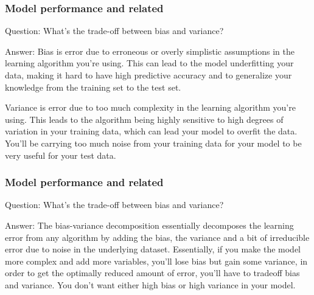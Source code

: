 \documentclass[11pt]{beamer}
\begin{document}
\begin{frame}
\frametitle{Model performance and related}
\begin{block}{Question:}
	What’s the trade-off between bias and variance?
\end{block}
\begin{block}{Answer:}
	Bias is error due to erroneous or overly simplistic assumptions in the learning algorithm you’re using. This can lead to the model underfitting your data, making it hard to have high predictive accuracy and to generalize your knowledge from the training set to the test set.
	
	Variance is error due to too much complexity in the learning algorithm you’re using. This leads to the algorithm being highly sensitive to high degrees of variation in your training data, which can lead your model to overfit the data. You’ll be carrying too much noise from your training data for your model to be very useful for your test data.
\end{block}
\end{frame}

\begin{frame}
\frametitle{Model performance and related}
\begin{block}{Question:}
What’s the trade-off between bias and variance?
\end{block}
\begin{block}{Answer:}
The bias-variance decomposition essentially decomposes the learning error from any algorithm by adding the bias, the variance and a bit of irreducible error due to noise in the underlying dataset. Essentially, if you make the model more complex and add more variables, you’ll lose bias but gain some variance, in order to get the optimally reduced amount of error, you’ll have to tradeoff bias and variance. You don’t want either high bias or high variance in your model.
\end{block}
\end{frame}
\end{document}
